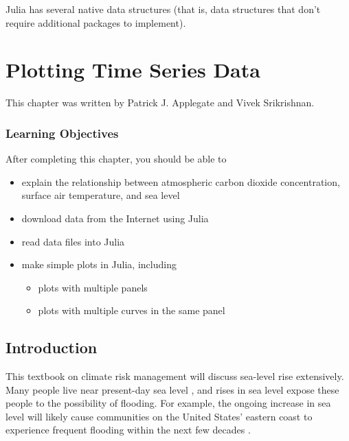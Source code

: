 \documentclass[
  11pt,
]{book}
\providecommand{\tightlist}{%
  \setlength{\itemsep}{0pt}\setlength{\parskip}{0pt}}
\begin{document}
Julia has several native data structures (that is, data structures that don't require additional packages to implement).

\hypertarget{plotting-time-series-data}{%
\chapter{Plotting Time Series Data}\label{plotting-time-series-data}}

This chapter was written by Patrick J. Applegate and Vivek Srikrishnan.

\hypertarget{learning-objectives-1}{%
\subsection*{Learning Objectives}\label{learning-objectives-1}}


After completing this chapter, you should be able to

\begin{itemize}
\tightlist
\item
  explain the relationship between atmospheric carbon dioxide concentration, surface air temperature, and sea level
\item
  download data from the Internet using Julia
\item
  read data files into Julia
\item
  make simple plots in Julia, including

  \begin{itemize}
  \tightlist
  \item
    plots with multiple panels
  \item
    plots with multiple curves in the same panel
  \end{itemize}
\end{itemize}

\hypertarget{introduction-2}{%
\section{Introduction}\label{introduction-2}}

This textbook on climate risk management will discuss sea-level rise extensively. Many people live near present-day sea level \citep[e.g.~][]{Nicholls2008-af}, and rises in sea level expose these people to the possibility of flooding. For example, the ongoing increase in sea level will likely cause communities on the United States' eastern coast to experience frequent flooding within the next few decades \citep{Spanger-Siegfried2014-mx}.
\end{document}
